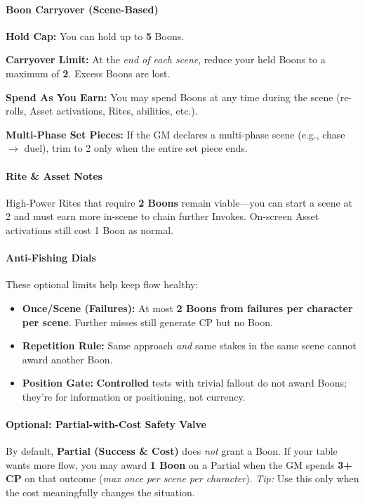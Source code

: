 \documentclass[11pt]{article}
\begin{document}
\paragraph{Boon Carryover (Scene-Based)}
\textbf{Hold Cap:} You can hold up to \textbf{5} Boons.

\textbf{Carryover Limit:} At the \emph{end of each scene}, reduce your held Boons to a maximum of \textbf{2}. Excess Boons are lost.

\textbf{Spend As You Earn:} You may spend Boons at any time during the scene (re-rolls, Asset activations, Rites, abilities, etc.).

\textbf{Multi-Phase Set Pieces:} If the GM declares a multi-phase scene (e.g., chase $\rightarrow$ duel), trim to 2 only when the entire set piece ends.

\paragraph{Rite \& Asset Notes}
High-Power Rites that require \textbf{2 Boons} remain viable—you can start a scene at 2 and must earn more in-scene to chain further Invokes. On-screen Asset activations still cost 1 Boon as normal.

\paragraph{Anti-Fishing Dials}
These optional limits help keep flow healthy:
\begin{itemize}
  \item \textbf{Once/Scene (Failures):} At most \textbf{2 Boons from failures per character per scene}. Further misses still generate CP but no Boon.
  \item \textbf{Repetition Rule:} Same approach \emph{and} same stakes in the same scene cannot award another Boon.
  \item \textbf{Position Gate:} \textbf{Controlled} tests with trivial fallout do not award Boons; they're for information or positioning, not currency.
\end{itemize}

\paragraph{Optional: Partial-with-Cost Safety Valve}
By default, \textbf{Partial (Success \& Cost)} does \emph{not} grant a Boon. If your table wants more flow, you may award \textbf{1 Boon} on a Partial when the GM spends \textbf{3+ CP} on that outcome (\emph{max once per scene per character}). \emph{Tip:} Use this only when the cost meaningfully changes the situation.
\end{document}
